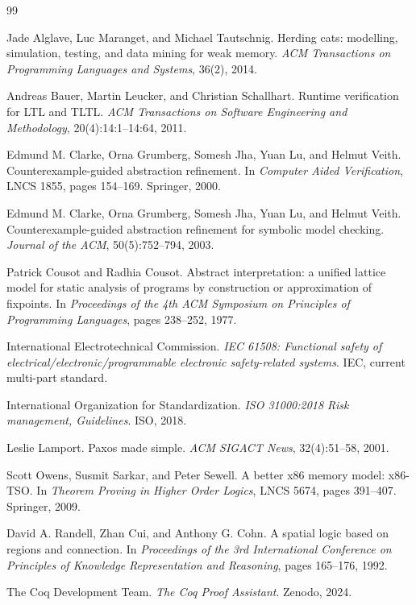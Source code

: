 \documentclass[a4paper,11pt]{article}
\begin{document}
\FloatBarrier

\begin{thebibliography}{99}

Jade Alglave, Luc Maranget, and Michael Tautschnig.
\newblock Herding cats: modelling, simulation, testing, and data mining for weak memory.
\newblock \emph{ACM Transactions on Programming Languages and Systems}, 36(2), 2014.

Andreas Bauer, Martin Leucker, and Christian Schallhart.
\newblock Runtime verification for LTL and TLTL.
\newblock \emph{ACM Transactions on Software Engineering and Methodology}, 20(4):14:1--14:64, 2011.

Edmund M. Clarke, Orna Grumberg, Somesh Jha, Yuan Lu, and Helmut Veith.
\newblock Counterexample-guided abstraction refinement.
\newblock In \emph{Computer Aided Verification}, LNCS 1855, pages 154--169. Springer, 2000.

Edmund M. Clarke, Orna Grumberg, Somesh Jha, Yuan Lu, and Helmut Veith.
\newblock Counterexample-guided abstraction refinement for symbolic model checking.
\newblock \emph{Journal of the ACM}, 50(5):752--794, 2003.

Patrick Cousot and Radhia Cousot.
\newblock Abstract interpretation: a unified lattice model for static analysis of programs by construction or approximation of fixpoints.
\newblock In \emph{Proceedings of the 4th ACM Symposium on Principles of Programming Languages}, pages 238--252, 1977.

International Electrotechnical Commission.
\newblock \emph{IEC 61508: Functional safety of electrical/electronic/programmable electronic safety-related systems}.
\newblock IEC, current multi-part standard.

International Organization for Standardization.
\newblock \emph{ISO 31000:2018 Risk management, Guidelines}.
\newblock ISO, 2018.

Leslie Lamport.
\newblock Paxos made simple.
\newblock \emph{ACM SIGACT News}, 32(4):51--58, 2001.

Scott Owens, Susmit Sarkar, and Peter Sewell.
\newblock A better x86 memory model: x86-TSO.
\newblock In \emph{Theorem Proving in Higher Order Logics}, LNCS 5674, pages 391--407. Springer, 2009.

David A. Randell, Zhan Cui, and Anthony G. Cohn.
\newblock A spatial logic based on regions and connection.
\newblock In \emph{Proceedings of the 3rd International Conference on Principles of Knowledge Representation and Reasoning}, pages 165--176, 1992.

The Coq Development Team.
\newblock \emph{The Coq Proof Assistant}.
\newblock Zenodo, 2024.

\end{thebibliography}
\end{document}
